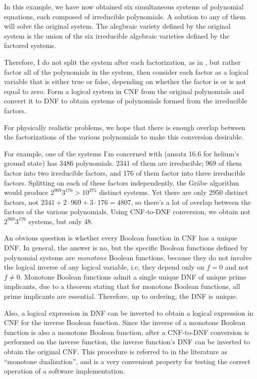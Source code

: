 \documentclass{article}
\begin{document}
In this example, we have now obtained six simultaneous systems of polynomial equations,
each composed of irreducible polynomials.  A solution to any of them will solve the
original system.  The alegbraic variety defined by the original system is the union
of the six irreducible algebraic varieties defined by the factored systems.

Therefore, I do not split the system after each factorization, as in \cite{Grabe06},
but rather factor all of the polynomials in the system, then consider
each factor as a logical variable that is either true or false, depending on
whether the factor is or is not equal to zero.  Form a logical system in CNF
from the original polynomials and convert it to DNF to obtain systems of polynomials
formed from the irreducible factors.

For physically realistic problems, we hope that there is enough overlap between
the factorizations of the various polynomials to make this conversion desirable.

For example, one of the systems I'm concerned with (ansatz 16.6 for helium's ground state)
has 3486 polynomials.  2341 of them are irreducible; 969 of them factor into two irreducible factors, and 176 of them
factor into three irreducible factors.  Splitting on each of these factors independently,
the Gr\"abe algorithm would produce $2^{969} 3^{176} > 10^{375}$
distinct systems.  Yet there are only 2950 distinct factors, not $2341+2\cdot969+3\cdot176=4807$,
so there's a lot of overlap between the factors of the various polynomials.
Using CNF-to-DNF conversion, we obtain not $2^{969} 3^{176}$ systems, but only 48.

An obvious question is whether every Boolean function in CNF has a unique DNF.  In general, the
answer is no, but the specific Boolean functions defined by polynomial systems are {\it monotone} Boolean functions,
because they do not involve the logical inverse of any logical variable, i.e,
they depend only on $f=0$ and not $f\ne 0$.  Monotone Boolean functions admit
a single unique DNF of unique prime implicants, due to a theorem stating that for monotone Boolean functions,
all prime implicants are essential.  Therefore, up to ordering, the DNF is unique.

Also, a logical expression in DNF can be inverted to obtain a logical expression in CNF
for the inverse Boolean function.  Since the inverse of a monotone Boolean function is also
a monotone Boolean function, after a CNF-to-DNF conversion is performed on the inverse function,
the inverse function's DNF can be inverted to obtain the original CNF.  This procedure
is referred to in the literature as ``monotone dualization'', and is a very convenient
property for testing the correct operation of a software implementation.
\end{document}
